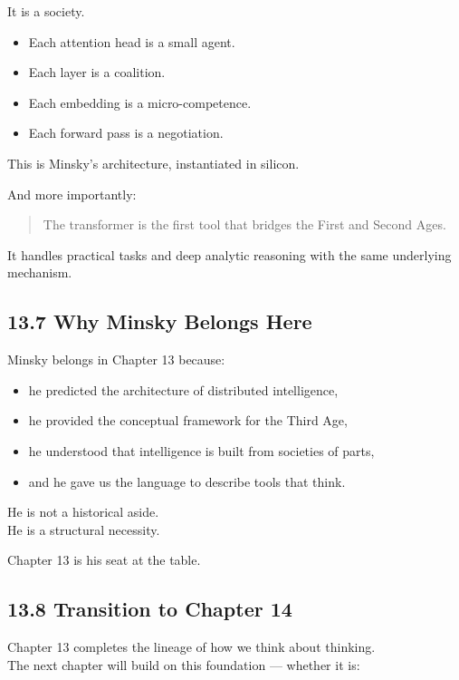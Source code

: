 It is a society.

\begin{itemize}
\tightlist
\item
  Each attention head is a small agent.
\item
  Each layer is a coalition.
\item
  Each embedding is a micro-competence.
\item
  Each forward pass is a negotiation.
\end{itemize}

This is Minsky's architecture, instantiated in silicon.

And more importantly:

\begin{quote}
The transformer is the first tool that bridges the First and Second
Ages.
\end{quote}

It handles practical tasks and deep analytic reasoning with the same
underlying mechanism.

\hypertarget{why-minsky-belongs-here}{%
\subsection{13.7 Why Minsky Belongs
Here}\label{why-minsky-belongs-here}}

Minsky belongs in Chapter 13 because:

\begin{itemize}
\tightlist
\item
  he predicted the architecture of distributed intelligence,
\item
  he provided the conceptual framework for the Third Age,
\item
  he understood that intelligence is built from societies of parts,
\item
  and he gave us the language to describe tools that think.
\end{itemize}

He is not a historical aside.\\
He is a structural necessity.

Chapter 13 is his seat at the table.

\hypertarget{transition-to-chapter-14}{%
\subsection{13.8 Transition to Chapter
14}\label{transition-to-chapter-14}}

Chapter 13 completes the lineage of how we think about thinking.\\
The next chapter will build on this foundation --- whether it is:

